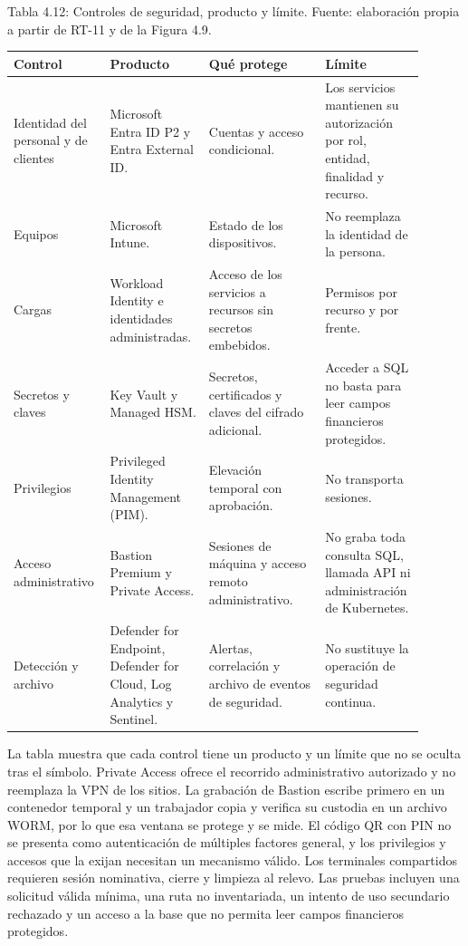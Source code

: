 \documentclass[11pt]{article}
\begin{document}
\par\vspace{0pt plus 10\baselineskip}\vspace{0pt plus -10\baselineskip}

Tabla 4.12: Controles de seguridad, producto y límite. Fuente: elaboración propia a partir de RT-11 y de la Figura 4.9.\par\nopagebreak
\begin{longtable}{@{}p{0.17\linewidth}p{0.23\linewidth}p{0.27\linewidth}p{0.23\linewidth}@{}}
\toprule Control & Producto & Qué protege & Límite \\
\midrule\endhead\bottomrule\endlastfoot
Identidad del personal y de clientes & Microsoft Entra ID P2 y Entra External ID. & Cuentas y acceso condicional. & Los servicios mantienen su autorización por rol, entidad, finalidad y recurso. \\
Equipos & Microsoft Intune. & Estado de los dispositivos. & No reemplaza la identidad de la persona. \\
Cargas & Workload Identity e identidades administradas. & Acceso de los servicios a recursos sin secretos embebidos. & Permisos por recurso y por frente. \\
Secretos y claves & Key Vault y Managed HSM. & Secretos, certificados y claves del cifrado adicional. & Acceder a SQL no basta para leer campos financieros protegidos. \\
Privilegios & Privileged Identity Management (PIM). & Elevación temporal con aprobación. & No transporta sesiones. \\
Acceso administrativo & Bastion Premium y Private Access. & Sesiones de máquina y acceso remoto administrativo. & No graba toda consulta SQL, llamada API ni administración de Kubernetes. \\
Detección y archivo & Defender for Endpoint, Defender for Cloud, Log Analytics y Sentinel. & Alertas, correlación y archivo de eventos de seguridad. & No sustituye la operación de seguridad continua. \\
\end{longtable}

La tabla muestra que cada control tiene un producto y un límite que no se oculta tras el símbolo. Private Access ofrece el recorrido administrativo autorizado y no reemplaza la VPN de los sitios. La grabación de Bastion escribe primero en un contenedor temporal y un trabajador copia y verifica su custodia en un archivo WORM, por lo que esa ventana se protege y se mide. El código QR con PIN no se presenta como autenticación de múltiples factores general, y los privilegios y accesos que la exijan necesitan un mecanismo válido. Los terminales compartidos requieren sesión nominativa, cierre y limpieza al relevo. Las pruebas incluyen una solicitud válida mínima, una ruta no inventariada, un intento de uso secundario rechazado y un acceso a la base que no permita leer campos financieros protegidos.
\end{document}

